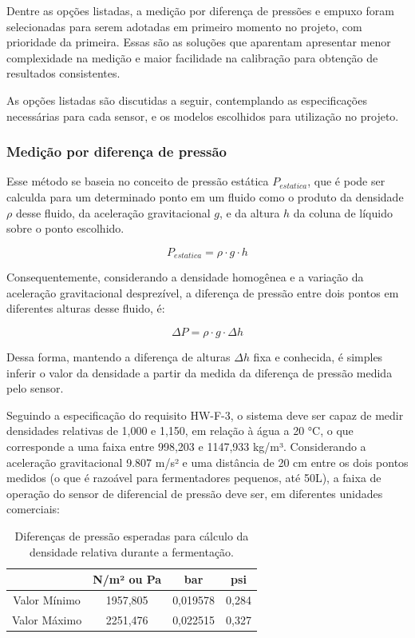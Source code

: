 Dentre as opções listadas, a medição por diferença de pressões e empuxo foram selecionadas para serem adotadas em primeiro momento no projeto, com prioridade da primeira. Essas são as soluções que aparentam apresentar menor complexidade na medição e maior facilidade na calibração para obtenção de resultados consistentes.


As opções listadas são discutidas a seguir, contemplando as especificações necessárias para cada sensor, e os modelos escolhidos para utilização no projeto.

\subsubsection{Medição por diferença de pressão} 

Esse método se baseia no conceito de pressão estática \(P_{estatica}\), que é pode ser calculda para um determinado ponto em um fluido como o produto da densidade \(\rho\) desse fluido, da aceleração gravitacional \(g\), e da altura \(h\) da coluna de líquido sobre o ponto escolhido.

\begin{equation}
P_{estatica} = \rho \cdot g \cdot h
\end{equation}

Consequentemente, considerando a densidade homogênea e a variação da aceleração gravitacional desprezível, a diferença de pressão entre dois pontos em diferentes alturas desse fluido, é:

\begin{equation}
\Delta P = \rho \cdot g \cdot \Delta h
\end{equation}

Dessa forma, mantendo a diferença de alturas \(\Delta h\) fixa e conhecida, é simples inferir o valor da densidade a partir da medida da diferença de pressão medida pelo sensor.


Seguindo a especificação do requisito HW-F-3, o sistema deve ser capaz de medir densidades relativas de 1,000 e 1,150, em relação à água a 20 °C, o que corresponde a uma faixa entre 998,203 e 1147,933 kg/m³. Considerando a aceleração gravitacional 9.807 m/s² e uma distância de 20 cm entre os dois pontos medidos (o que é razoável para fermentadores pequenos, até 50L), a faixa de operação do sensor de diferencial de pressão deve ser, em diferentes unidades comerciais:

\begin{table}[H]
    \begin{center}
        \begin{tabular}{ |c|c|c|c| } 
            \hline
            & N/m² ou Pa & bar & psi \\
            \hline
            Valor Mínimo & 1957,805 & 0,019578 & 0,284 \\ 
            \hline
            Valor Máximo & 2251,476 & 0,022515 & 0,327 \\ 
            \hline
        \end{tabular}
        \caption{\label{tab:densidades}Diferenças de pressão esperadas para cálculo da densidade relativa durante a fermentação.}
    \end{center}
\end{table}

